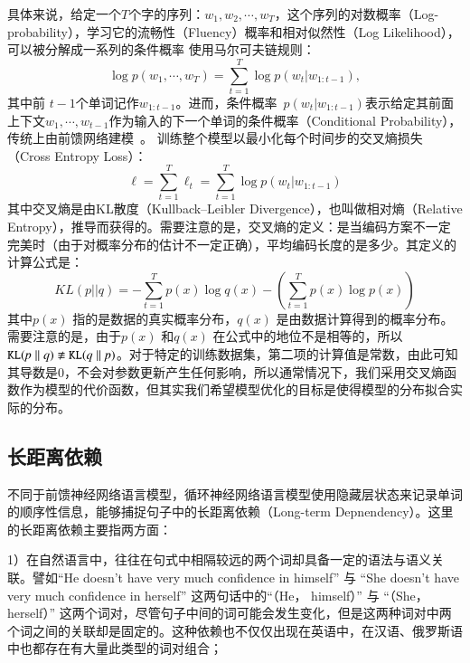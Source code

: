 具体来说，给定一个$T$个字的序列：$w_1,w_2,\cdots,w_T$，这个序列的对数概率（Log-probability），学习它的流畅性（Fluency）概率和相对似然性（Log Likelihood），可以被分解成一系列的条件概率 使用马尔可夫链规则：
\begin{equation}
\label{laguage_model}
 \log p(w_1,\cdots, w_T ) = \sum_{t=1}^T \log p(w_t | w_{1:t-1}),
\end{equation}
其中前 $t-1$个单词记作$w_ {1:t-1}$。进而，条件概率~$p(w_t | w_ {1:t-1})$表示给定其前面上下文$ w_1,\cdots,w_ {t-1} $作为输入的下一个单词的条件概率（Conditional Probability）， 传统上由前馈网络建模~。 训练整个模型以最小化每个时间步的交叉熵损失（Cross Entropy Loss）：
\begin{equation}\label{equ:losses}
  \ell=\sum_{t=1}^{T}\ell_t=\sum_{t=1}^{T}\log p(w_t | w_{1:t-1})
\end{equation}
其中交叉熵是由KL散度（Kullback–Leibler Divergence），也叫做相对熵（Relative Entropy），推导而获得的。需要注意的是，交叉熵的定义：是当编码方案不一定完美时（由于对概率分布的估计不一定正确），平均编码长度的是多少。其定义的计算公式是：
\begin{equation}\label{equ:losses}
  KL(p||q)=-\sum_{t=1}^{T}p(x)\log q(x) - (\sum_{t=1}^{T}p(x)\log p(x))
\end{equation}
其中$p(x)$ 指的是数据的真实概率分布，$q(x)$ 是由数据计算得到的概率分布。需要注意的是，由于$p(x)$ 和$q(x)$ 在公式中的地位不是相等的，所以$\tt KL \it(p\parallel q)\not\equiv \tt KL \it (q\parallel p)$。对于特定的训练数据集，第二项的计算值是常数，由此可知其导数是0，不会对参数更新产生任何影响，所以通常情况下，我们采用交叉熵函数作为模型的代价函数，但其实我们希望模型优化的目标是使得模型的分布拟合实际的分布。

\subsection{长距离依赖}

不同于前馈神经网络语言模型，循环神经网络语言模型使用隐藏层状态来记录单词的顺序性信息，能够捕捉句子中的长距离依赖（Long-term Depnendency）。这里的长距离依赖主要指两方面：

1）在自然语言中，往往在句式中相隔较远的两个词却具备一定的语法与语义关联。譬如``He doesn't have very much confidence in himself'' 与 ``She doesn't have very much confidence in herself'' 这两句话中的``（He， himself）'' 与 ``（She， herself）'' 这两个词对，尽管句子中间的词可能会发生变化，但是这两种词对中两个词之间的关联却是固定的。这种依赖也不仅仅出现在英语中，在汉语、俄罗斯语中也都存在有大量此类型的词对组合；

